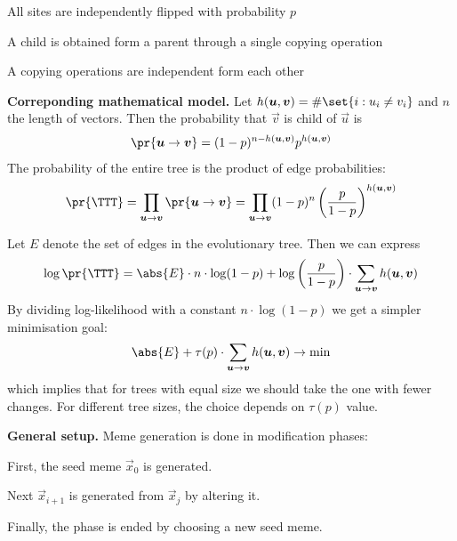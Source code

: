 \documentclass[landscape,footrule]{foils}
\begin{document}

\begin{triangles}
\item All sites are independently flipped with probability $p$
\item A child is obtained form a parent through a single copying operation
\item A copying operations are independent form each other
\end{triangles}
\vspace*{1cm}


\textbf{Correponding mathematical model.}
Let $h(\vec{u},\vec{v})=\#\set{i: u_i\neq v_i}$ and $n$ the length of vectors. Then  the probability that $\vec{v}$ is child of $\vec{u}$ is
\begin{align*}
\pr{\vec{u}\to\vec{v}}=(1-p)^{n-h(\vec{u},\vec{v})}p^{h(\vec{u},\vec{v})}
\end{align*}
The probability of the entire tree is the product of edge probabilities:
\begin{align*}
\pr{\TTT}=\prod_{\vec{u}\to\vec{v}}\pr{\vec{u}\to\vec{v}}= \prod_{\vec{u}\to\vec{v}}(1-p)^{n}\left(\frac{p}{1-p}\right)^{h(\vec{u},\vec{v})}
\end{align*}


Let $E$ denote the set of edges in the evolutionary tree. Then we can express 
\begin{align*}
\log \pr{\TTT}=\abs{E}\cdot n\cdot\log(1-p)+\log\left(\frac{p}{1-p}\right)\cdot \sum_{\vec{u}\to\vec{v}} h(\vec{u},\vec{v})
\end{align*}
By dividing log-likelihood with a constant $n\cdot\log(1-p)$ we get a simpler minimisation goal:
\begin{align*}
\abs{E}+\tau(p)\cdot \sum_{\vec{u}\to\vec{v}} h(\vec{u},\vec{v})\to\min
\end{align*}
which implies that for trees with equal size we should take the one with fewer changes. For different tree sizes, the choice depends on $\tau(p)$ value. 


\enlargethispage{1cm}

\textbf{General setup.} Meme generation is done in modification phases:
\begin{triangles}
\item First, the seed meme $\vec{x}_0$ is generated.
\item Next $\vec{x}_{i+1}$ is generated from $\vec{x}_j$ by altering it.
\item Finally, the phase is ended by choosing a new seed meme. \vspace*{2ex}
\end{triangles} 
\end{document}
